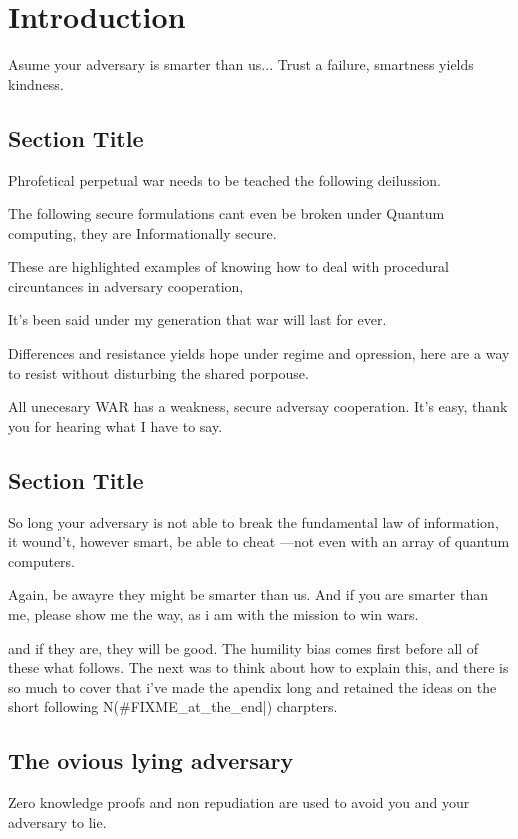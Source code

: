 \chapter{Introduction}
Asume your adversary is smarter than us... Trust a failure, smartness yields kindness. 


\section{Section Title}
Phrofetical perpetual war needs to be teached the following deilussion. 

The following secure formulations cant even be broken under Quantum computing, they are Informationally secure. 

These are highlighted examples of knowing how to deal with procedural circuntances in adversary cooperation, 

It's been said under my generation that war will last for ever. 

Differences and resistance yields hope under regime and opression, 
here are a way to resist without disturbing the shared porpouse. 

All unecesary WAR has a weakness, secure adversay cooperation. It's easy, thank you for hearing what I have to say. 


\section{Section Title}
So long your adversary is not able to break the fundamental law of information, 
it wound't, however smart, be able to cheat ---not even with an array of quantum computers. 

Again, be awayre they might be smarter than us. And if you are smarter than me, 
please show me the way, as i am with the mission to win wars. 

and if they are, they will be good. The humility bias comes first before all of these what follows. 
The next was to think about how to explain this, and there is so much to cover that i've made the 
apendix long and retained the ideas on the short following N(#FIXME_at_the_end|) charpters. 

\section{The ovious lying adversary}
Zero knowledge proofs and non repudiation are used to avoid you and your adversary to lie. 

